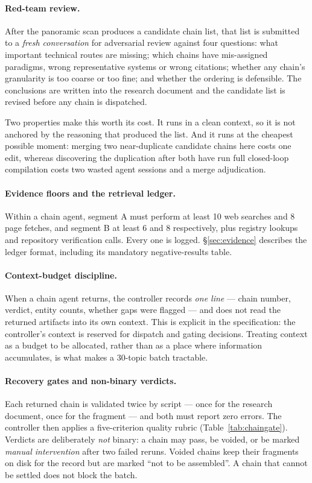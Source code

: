 \documentclass[10pt,a4paper]{article}
\begin{document}
\paragraph{Red-team review.} After the panoramic scan produces a candidate chain
list, that list is submitted to a \emph{fresh conversation} for adversarial
review against four questions: what important technical routes are missing; which
chains have mis-assigned paradigms, wrong representative systems or wrong
citations; whether any chain's granularity is too coarse or too fine; and whether
the ordering is defensible. The conclusions are written into the research
document and the candidate list is revised before any chain is dispatched.

Two properties make this worth its cost. It runs in a clean context, so it is not
anchored by the reasoning that produced the list. And it runs at the cheapest
possible moment: merging two near-duplicate candidate chains here costs one
edit, whereas discovering the duplication after both have run full closed-loop
compilation costs two wasted agent sessions and a merge adjudication.

\paragraph{Evidence floors and the retrieval ledger.} Within a chain agent,
segment A must perform at least 10 web searches and 8 page fetches, and segment B
at least 6 and 8 respectively, plus registry lookups and repository verification
calls. Every one is logged. \S\ref{sec:evidence} describes the ledger format,
including its mandatory negative-results table.

\paragraph{Context-budget discipline.} When a chain agent returns, the controller
records \emph{one line} --- chain number, verdict, entity counts, whether gaps
were flagged --- and does not read the returned artifacts into its own context.
This is explicit in the specification: the controller's context is reserved for
dispatch and gating decisions. Treating context as a budget to be allocated,
rather than as a place where information accumulates, is what makes a 30-topic
batch tractable.

\paragraph{Recovery gates and non-binary verdicts.} Each returned chain is
validated twice by script --- once for the research document, once for the
fragment --- and both must report zero errors. The controller then applies a
five-criterion quality rubric (Table~\ref{tab:chaingate}). Verdicts are
deliberately \emph{not} binary: a chain may pass, be voided, or be marked
\emph{manual intervention} after two failed reruns. Voided chains keep their
fragments on disk for the record but are marked ``not to be assembled''. A
chain that cannot be settled does not block the batch.
\end{document}
